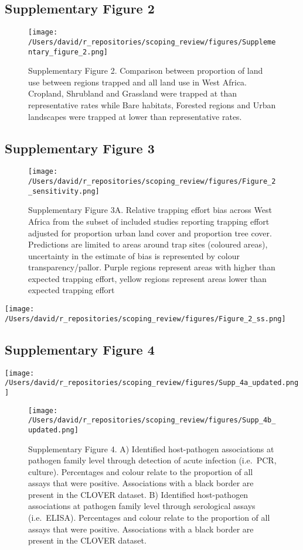\documentclass[
]{article}
\begin{document}
\hypertarget{supplementary-figure-2}{%
\subsection{Supplementary Figure 2}\label{supplementary-figure-2}}

\begin{figure}
\centering
\texttt{[image: /Users/david/r\_repositories/scoping\_review/figures/Supplementary\_figure\_2.png]}
\caption{Supplementary Figure 2. Comparison between proportion of land
use between regions trapped and all land use in West Africa. Cropland,
Shrubland and Grassland were trapped at than representative rates while
Bare habitats, Forested regions and Urban landscapes were trapped at
lower than representative rates.}
\end{figure}

\hypertarget{supplementary-figure-3}{%
\subsection{Supplementary Figure 3}\label{supplementary-figure-3}}

\begin{figure}
\centering
\texttt{[image: /Users/david/r\_repositories/scoping\_review/figures/Figure\_2\_sensitivity.png]}
\caption{Supplementary Figure 3A. Relative trapping effort bias across
West Africa from the subset of included studies reporting trapping
effort adjusted for proportion urban land cover and proportion tree
cover. Predictions are limited to areas around trap sites (coloured
areas), uncertainty in the estimate of bias is represented by colour
transparency/pallor. Purple regions represent areas with higher than
expected trapping effort, yellow regions represent areas lower than
expected trapping effort}
\end{figure}

\texttt{[image: /Users/david/r\_repositories/scoping\_review/figures/Figure\_2\_ss.png]}

\hypertarget{supplementary-figure-4}{%
\subsection{Supplementary Figure 4}\label{supplementary-figure-4}}

\texttt{[image: /Users/david/r\_repositories/scoping\_review/figures/Supp\_4a\_updated.png]}

\begin{figure}
\centering
\texttt{[image: /Users/david/r\_repositories/scoping\_review/figures/Supp\_4b\_updated.png]}
\caption{Supplementary Figure 4. A) Identified host-pathogen
associations at pathogen family level through detection of acute
infection (i.e.~PCR, culture). Percentages and colour relate to the
proportion of all assays that were positive. Associations with a black
border are present in the CLOVER dataset. B) Identified host-pathogen
associations at pathogen family level through serological assays
(i.e.~ELISA). Percentages and colour relate to the proportion of all
assays that were positive. Associations with a black border are present
in the CLOVER dataset.}
\end{figure}
\end{document}
